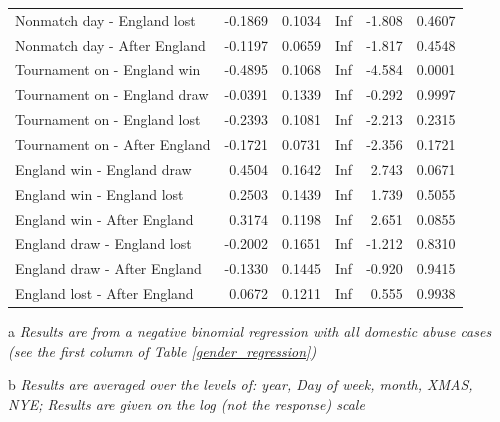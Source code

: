 \documentclass[12pt, letterpaper]{article}
\begin{document}
\begin{table}[ht]
{\begin{threeparttable}
\begin{tabular}{lrrrrl}
  Nonmatch day - England lost & -0.1869 & 0.1034 & Inf & -1.808 & 0.4607 \\ 
  Nonmatch day - After England & -0.1197 & 0.0659 & Inf & -1.817 & 0.4548 \\ 
  Tournament on - England win & -0.4895 & 0.1068 & Inf & -4.584 & 0.0001 \\ 
  Tournament on - England draw & -0.0391 & 0.1339 & Inf & -0.292 & 0.9997 \\ 
  Tournament on - England lost & -0.2393 & 0.1081 & Inf & -2.213 & 0.2315 \\ 
  Tournament on - After England & -0.1721 & 0.0731 & Inf & -2.356 & 0.1721 \\ 
  England win - England draw & 0.4504 & 0.1642 & Inf & 2.743 & 0.0671 \\ 
  England win - England lost & 0.2503 & 0.1439 & Inf & 1.739 & 0.5055 \\ 
  England win - After England & 0.3174 & 0.1198 & Inf & 2.651 & 0.0855 \\ 
  England draw - England lost & -0.2002 & 0.1651 & Inf & -1.212 & 0.8310 \\ 
  England draw - After England & -0.1330 & 0.1445 & Inf & -0.920 & 0.9415 \\ 
  England lost - After England & 0.0672 & 0.1211 & Inf & 0.555 & 0.9938 \\ 
   \hline
   
   


\end{tabular}
\begin{tablenotes}
      \item[a] \textit{Results are from a negative binomial regression with all domestic abuse cases (see the first column of Table \ref{gender_regression})}
      \item[b] \textit{Results are averaged over the levels of: year, Day of week, month, XMAS, NYE;  Results are given on the log (not the response) scale}
    \end{tablenotes}
\end{threeparttable} }
\end{table}
\end{document}
